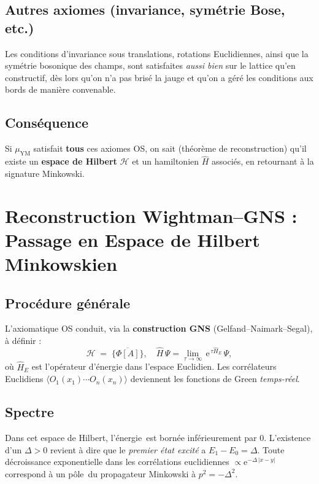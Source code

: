 \subsection*{Autres axiomes (invariance, symétrie Bose, etc.)}
Les conditions d’invariance sous translations, rotations Euclidiennes, ainsi que la symétrie bosonique des champs, sont satisfaites \emph{aussi bien} sur le lattice qu’en constructif, dès lors qu’on n’a pas brisé la jauge et qu’on a géré les conditions aux bords de manière convenable.

\subsection*{Conséquence}
Si \(\mu_{\mathrm{YM}}\) satisfait \textbf{tous} ces axiomes OS, on sait (théorème de reconstruction) qu’il existe un \textbf{espace de Hilbert} \(\mathcal{H}\) et un hamiltonien \(\widehat{H}\) associés, en retournant à la signature Minkowski.

\vspace{1em}

\section{Reconstruction Wightman--GNS : Passage en Espace de Hilbert Minkowskien}
\label{sec:8.4}

\subsection*{Procédure générale}
L’axiomatique OS conduit, via la \textbf{construction GNS} (Gelfand–Naimark–Segal), à définir :
\[
\mathcal{H} \;=\; \overline{\{\Phi[A]\}}, \quad
\widehat{H}\,\Psi = \lim_{\tau\to \infty}\,\mathrm{e}^{\,\tau \widehat{H}_E}\,\Psi,
\]
où \(\widehat{H}_E\) est l’opérateur d’énergie dans l’espace Euclidien. Les corrélateurs Euclidiens \(\langle O_1(x_1)\cdots O_n(x_n)\rangle\) deviennent les fonctions de Green \emph{temps-réel}.

\subsection*{Spectre}
Dans cet espace de Hilbert, l’\og énergie\fg\ est bornée inférieurement par \(0\). L’existence d’un \(\Delta>0\) revient à dire que le \emph{premier état excité} a \(E_1 - E_0 = \Delta\). Toute décroissance exponentielle dans les corrélations euclidiennes \(\propto \mathrm{e}^{-\Delta \,|x-y|}\) correspond à un \og pôle\fg\ du propagateur Minkowski à \(p^2 = -\Delta^2\).

